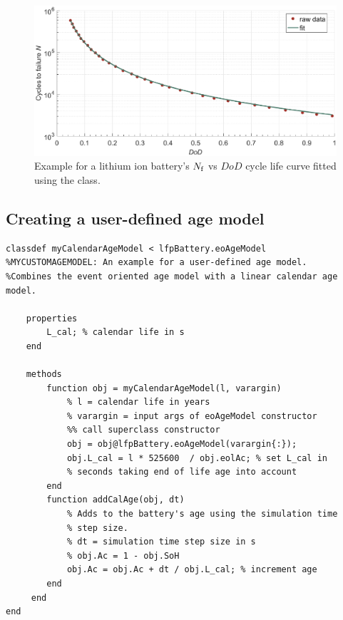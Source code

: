 \begin{figure}[t!]
	\captionsetup{type=figure}
	\centering
	\includegraphics[width=\textwidth]{woehlerFit}
	\caption[Example for a lithium ion battery's $N\subi{f}$ vs $DoD$ cycle life curve fitted using the  class]{Example for a lithium ion battery's $N\subi{f}$ vs $DoD$ cycle life curve fitted using the  class.}
	\label{fig:woehlerFit}
\end{figure}
\subsection{Creating a user-defined age model}
\begin{lstlisting}
classdef myCalendarAgeModel < lfpBattery.eoAgeModel
%MYCUSTOMAGEMODEL: An example for a user-defined age model.
%Combines the event oriented age model with a linear calendar age model.

	properties
		L_cal; % calendar life in s
	end
	
	methods
		function obj = myCalendarAgeModel(l, varargin)
			% l = calendar life in years
			% varargin = input args of eoAgeModel constructor
			%% call superclass constructor
			obj = obj@lfpBattery.eoAgeModel(varargin{:});
			obj.L_cal = l * 525600  / obj.eolAc; % set L_cal in
			% seconds taking end of life age into account
		end
		function addCalAge(obj, dt)
			% Adds to the battery's age using the simulation time
			% step size.
			% dt = simulation time step size in s
			% obj.Ac = 1 - obj.SoH
			obj.Ac = obj.Ac + dt / obj.L_cal; % increment age
	 	end
	 end
end
\end{lstlisting}
